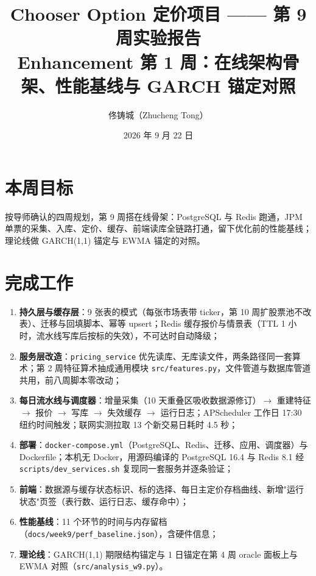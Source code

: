 \documentclass[11pt]{ctexart}
\title{\textbf{Chooser Option 定价项目 —— 第 9 周实验报告}\\
\large Enhancement 第 1 周：在线架构骨架、性能基线与 GARCH 锚定对照}
\author{佟铸城（Zhucheng Tong）}
\date{2026 年 9 月 22 日}
\begin{document}
\maketitle

\section{本周目标}
按导师确认的四周规划，第 9 周搭在线骨架：PostgreSQL 与 Redis 跑通，JPM 单票的采集、入库、定价、缓存、前端读库全链路打通，留下优化前的性能基线；理论线做 GARCH(1,1) 锚定与 EWMA 锚定的对照。

\section{完成工作}
\begin{enumerate}
  \item \textbf{持久层与缓存层}：9 张表的模式（每张市场表带 ticker，第 10 周扩股票池不改表）、迁移与回填脚本、幂等 upsert；Redis 缓存报价与情景表（TTL 1 小时，流水线写库后按标的失效），不可达时自动降级；
  \item \textbf{服务层改造}：\texttt{pricing\_service} 优先读库、无库读文件，两条路径同一套算术；第 2 周特征算术抽成通用模块 \texttt{src/features.py}，文件管道与数据库管道共用，前八周脚本零改动；
  \item \textbf{每日流水线与调度器}：增量采集（10 天重叠区吸收数据源修订）$\to$ 重建特征 $\to$ 报价 $\to$ 写库 $\to$ 失效缓存 $\to$ 运行日志；APScheduler 工作日 17:30 纽约时间触发；联网实测拉取 13 个新交易日耗时 4.5 秒；
  \item \textbf{部署}：\texttt{docker-compose.yml}（PostgreSQL、Redis、迁移、应用、调度器）与 Dockerfile；本机无 Docker，用源码编译的 PostgreSQL 16.4 与 Redis 8.1 经 \texttt{scripts/dev\_services.sh} 复现同一套服务并逐条验证；
  \item \textbf{前端}：数据源与缓存状态标识、标的选择、每日主定价存档曲线、新增"运行状态"页签（表行数、运行日志、缓存命中）；
  \item \textbf{性能基线}：11 个环节的时间与内存留档（\texttt{docs/week9/perf\_baseline.json}），含硬件信息；
  \item \textbf{理论线}：GARCH(1,1) 期限结构锚定与 1 日锚定在第 4 周 oracle 面板上与 EWMA 对照（\texttt{src/analysis\_w9.py}）。
\end{enumerate}
\end{document}
